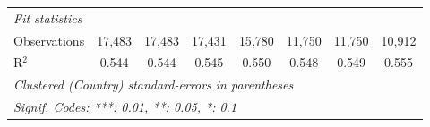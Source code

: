 \begin{tabular}{lccccccc}
   \midrule \emph{Fit statistics}\\
   Observations                                                                          & 17,483       & 17,483       & 17,431       & 15,780  & 11,750  & 11,750  & 10,912\\  
   R$^2$                                                                                 & 0.544        & 0.544        & 0.545        & 0.550   & 0.548   & 0.549   & 0.555\\  
   \midrule
   \multicolumn{8}{l}{\emph{Clustered (Country) standard-errors in parentheses}}\\
   \multicolumn{8}{l}{\emph{Signif. Codes: ***: 0.01, **: 0.05, *: 0.1}}\\
\end{tabular}
\par\endgroup


